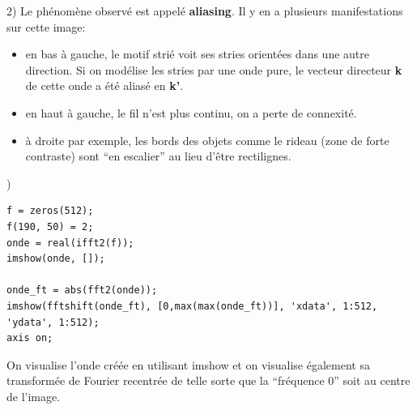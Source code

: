 \documentclass[a4paper, 11pt]{article}
\begin{document}

2) Le phénomène observé est appelé \textbf{aliasing}. Il y en a plusieurs manifestations sur cette image:
\begin{itemize}
  \item en bas à gauche, le motif strié voit ses stries orientées dans une autre direction. Si on modélise les stries
    par une onde pure, le vecteur directeur \textbf{k} de cette onde a été aliasé en \textbf{k'}.
  \item en haut à gauche, le fil n'est plus continu, on a perte de connexité. 
  \item à droite par exemple, les bords des objets comme le rideau (zone de forte contraste) sont ``en escalier'' au
    lieu d'être rectilignes.
\end{itemize}

)
\begin{lstlisting}[frame=single]
f = zeros(512);
f(190, 50) = 2;
onde = real(ifft2(f));
imshow(onde, []);

onde_ft = abs(fft2(onde));
imshow(fftshift(onde_ft), [0,max(max(onde_ft))], 'xdata', 1:512, 'ydata', 1:512);
axis on;
\end{lstlisting}


On visualise l'onde créée en utilisant imshow et on visualise également sa transformée de Fourier recentrée de telle
sorte que la ``fréquence 0'' soit au centre de l'image. 

\begin{figure}[!h]
\centering
{}%
\qquad
{}%
\end{figure}
\end{document}
